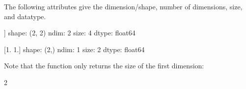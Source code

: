 \documentclass[letterpaper,10pt,english]{sphinxmanual}
\begin{document}
The following attributes give the dimension/shape, number of dimensions, size, and datatype.

\begin{sphinxVerbatim}[commandchars=\\\{\}]
    
\end{sphinxVerbatim}

\begin{sphinxVerbatim}[commandchars=\\\{\}]
[[2. 2.]
 [0. 2.]]
    shape: (2, 2)
    ndim: 2
    size: 4
    dtype: float64
    
[1. 1.]
    shape: (2,)
    ndim: 1
    size: 2
    dtype: float64
    
\end{sphinxVerbatim}

Note that the function  only returns the size of the first dimension:

\begin{sphinxVerbatim}[commandchars=\\\{\}]
 \PYG{p}{[}\PYG{p}{]}  
\end{sphinxVerbatim}

\begin{sphinxVerbatim}[commandchars=\\\{\}]
2
\end{sphinxVerbatim}
\end{document}
